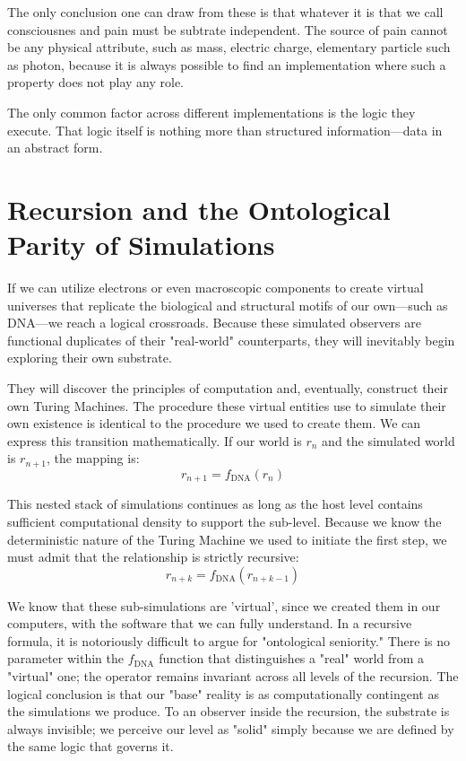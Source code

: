 The only conclusion one can draw from these is that whatever it is that we call consciousnes and pain must be subtrate independent.
The source of pain cannot be any physical attribute, such as mass, electric charge, elementary particle such as photon, because it is always possible to find an implementation where such a property does not play any role.

The only common factor across different implementations is the logic they execute.
That logic itself is nothing more than structured information—data in an abstract form.


\section{Recursion and the Ontological Parity of Simulations}

If we can utilize electrons or even macroscopic components to create virtual universes that replicate the biological and structural motifs of our own—such as DNA—we reach a logical crossroads. Because these simulated observers are functional duplicates of their "real-world" counterparts, they will inevitably begin exploring their own substrate. 

They will discover the principles of computation and, eventually, construct their own Turing Machines. The procedure these virtual entities use to simulate their own existence is identical to the procedure we used to create them. We can express this transition mathematically. If our world is $r_n$ and the simulated world is $r_{n+1}$, the mapping is:
\[ r_{n+1} = f_{\text{DNA}}(r_n) \]

This nested stack of simulations continues as long as the host level contains sufficient computational density to support the sub-level. Because we know the deterministic nature of the Turing Machine we used to initiate the first step, we must admit that the relationship is strictly recursive:
\[ r_{n+k} = f_{\text{DNA}}(r_{n+k-1}) \]

We know that these sub-simulations are 'virtual', since we created them in our computers, with the software that we can fully understand.
In a recursive formula, it is notoriously difficult to argue for "ontological seniority."
There is no parameter within the $f_{\text{DNA}}$ function that distinguishes a "real" world from a "virtual" one; the operator remains invariant across all levels of the recursion.
The logical conclusion is that our "base" reality is as computationally contingent as the simulations we produce.
To an observer inside the recursion, the substrate is always invisible; we perceive our level as "solid" simply because we are defined by the same logic that governs it.


